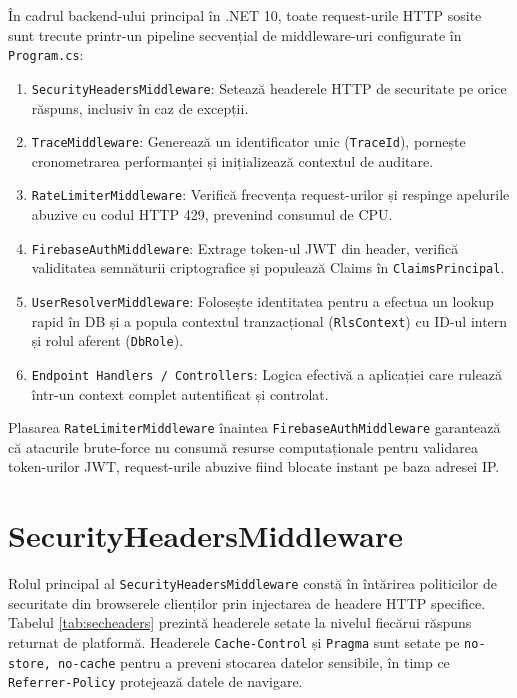 În cadrul backend-ului principal în .NET 10, toate request-urile HTTP sosite sunt trecute printr-un pipeline secvențial de middleware-uri configurate în \texttt{Program.cs}:
\begin{enumerate}
    \item \texttt{SecurityHeadersMiddleware}: Setează headerele HTTP de securitate pe orice răspuns, inclusiv în caz de excepții.
    \item \texttt{TraceMiddleware}: Generează un identificator unic (\texttt{TraceId}), pornește cronometrarea performanței și inițializează contextul de auditare.
    \item \texttt{RateLimiterMiddleware}: Verifică frecvența request-urilor și respinge apelurile abuzive cu codul HTTP 429, prevenind consumul de CPU.
    \item \texttt{FirebaseAuthMiddleware}: Extrage token-ul JWT din header, verifică validitatea semnăturii criptografice și populează Claims în \texttt{ClaimsPrincipal}.
    \item \texttt{UserResolverMiddleware}: Folosește identitatea pentru a efectua un lookup rapid în DB și a popula contextul tranzacțional (\texttt{RlsContext}) cu ID-ul intern și rolul aferent (\texttt{DbRole}).
    \item \texttt{Endpoint Handlers / Controllers}: Logica efectivă a aplicației care rulează într-un context complet autentificat și controlat.
\end{enumerate}

Plasarea \texttt{RateLimiterMiddleware} înaintea \texttt{FirebaseAuthMiddleware} garantează că atacurile brute-force nu consumă resurse computaționale pentru validarea token-urilor JWT, request-urile abuzive fiind blocate instant pe baza adresei IP.

\section{SecurityHeadersMiddleware}

Rolul principal al \texttt{SecurityHeadersMiddleware} constă în întărirea politicilor de securitate din browserele clienților prin injectarea de headere HTTP specifice. Tabelul \ref{tab:secheaders} prezintă headerele setate la nivelul fiecărui răspuns returnat de platformă. Headerele \texttt{Cache-Control} și \texttt{Pragma} sunt setate pe \texttt{no-store, no-cache} pentru a preveni stocarea datelor sensibile, în timp ce \texttt{Referrer-Policy} protejează datele de navigare.

